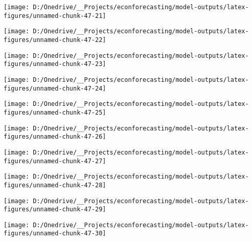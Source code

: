 \documentclass[11pt, letterpaper]{article}\usepackage[]{graphicx}\usepackage[]{color}
\begin{document}
{\centering \texttt{[image: D:/Onedrive/\_\_Projects/econforecasting/model-outputs/latex-figures/unnamed-chunk-47-21]} 

}




{\centering \texttt{[image: D:/Onedrive/\_\_Projects/econforecasting/model-outputs/latex-figures/unnamed-chunk-47-22]} 

}




{\centering \texttt{[image: D:/Onedrive/\_\_Projects/econforecasting/model-outputs/latex-figures/unnamed-chunk-47-23]} 

}




{\centering \texttt{[image: D:/Onedrive/\_\_Projects/econforecasting/model-outputs/latex-figures/unnamed-chunk-47-24]} 

}




{\centering \texttt{[image: D:/Onedrive/\_\_Projects/econforecasting/model-outputs/latex-figures/unnamed-chunk-47-25]} 

}




{\centering \texttt{[image: D:/Onedrive/\_\_Projects/econforecasting/model-outputs/latex-figures/unnamed-chunk-47-26]} 

}




{\centering \texttt{[image: D:/Onedrive/\_\_Projects/econforecasting/model-outputs/latex-figures/unnamed-chunk-47-27]} 

}




{\centering \texttt{[image: D:/Onedrive/\_\_Projects/econforecasting/model-outputs/latex-figures/unnamed-chunk-47-28]} 

}




{\centering \texttt{[image: D:/Onedrive/\_\_Projects/econforecasting/model-outputs/latex-figures/unnamed-chunk-47-29]} 

}




{\centering \texttt{[image: D:/Onedrive/\_\_Projects/econforecasting/model-outputs/latex-figures/unnamed-chunk-47-30]} 

}
\end{document}
